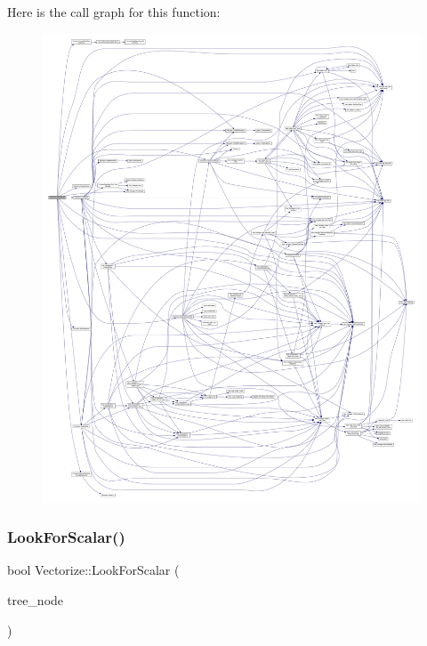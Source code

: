 Here is the call graph for this function\+:
\nopagebreak
\begin{figure}[H]
\begin{center}
\leavevmode
\includegraphics[width=350pt]{d5/da5/classVectorize_aecc4f293d0b0f625f26005582886ca48_cgraph}
\end{center}
\end{figure}
\mbox{\label{classVectorize_a34c9105b57eff7b44aa7671815adc537}} 
\subsubsection{\texorpdfstring{Look\+For\+Scalar()}{LookForScalar()}}
{\footnotesize\ttfamily bool Vectorize\+::\+Look\+For\+Scalar (\begin{DoxyParamCaption}\item[{const \hyperlink{tree__node_8hpp_a3cf5d02292c940f3892425a5b5fdec3c}{tree\+\_\+node\+Const\+Ref}}]{tree\+\_\+node }\end{DoxyParamCaption})\hspace{0.3cm}{\ttfamily [private]}}



